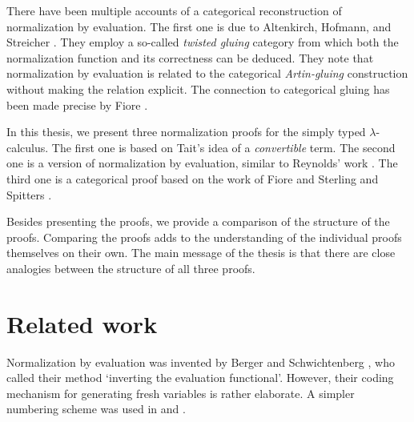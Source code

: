 \begin{comment}
One of the reasons for considering reduction-free normalization is the extensionality axiom
\begin{mathpar}
\inferrule[ext]
    {\conv{\app{t}{x}}{\app{t'}{x}}{\tau}}
    {\conv{t}{t'}{\functy{\sigma}{\tau}}}
\end{mathpar}
This axiom states that two functions are equal whenever their behaviors are the same, i.e. they give the same output for all inputs. The axiom is desirable since it allows us to reason about functions based on not only their definition but also their behavior.
\end{comment}

There have been multiple accounts of a categorical reconstruction of normalization by evaluation. The first one is due to Altenkirch, Hofmann, and Streicher \cite{altenkirch:1995:ctcs}. They employ a so-called \textit{twisted gluing} category from which both the normalization function and its correctness can be deduced. They note that normalization by evaluation is related to the categorical \textit{Artin-gluing} construction \cite{wraith:1974:jpaa} without making the relation explicit. The connection to categorical gluing has been made precise by Fiore \cite{fiore:2002:ppdp, fiore:2022:mscs}.

In this thesis, we present three normalization proofs for the simply typed $\lambda$-calculus. The first one is based on Tait's idea of a \textit{convertible} term. The second one is a version of normalization by evaluation, similar to Reynolds' work \cite{reynolds1998normalization}. The third one is a categorical proof based on the work of Fiore \cite{fiore:2002:ppdp, fiore:2022:mscs} and Sterling and Spitters \cite{sterling:2018:arxiv}.

Besides presenting the proofs, we provide a comparison of the structure of the proofs. Comparing the proofs adds to the understanding of the individual proofs themselves on their own. The main message of the thesis is that there are close analogies between the structure of all three proofs.

\section{Related work}

Normalization by evaluation was invented by Berger and Schwichtenberg \cite{DBLP:conf/lics/BergerS91}, who called their method `inverting the evaluation functional'. However, their coding mechanism for generating fresh variables is rather elaborate. A simpler numbering scheme was used in \cite{berger:1993:tlca} and \cite{dybjer:2002:appsem}.

